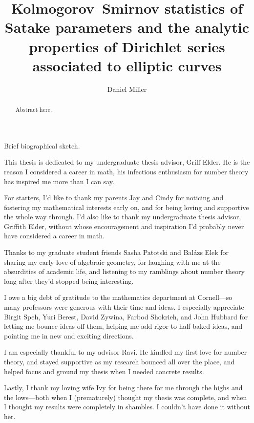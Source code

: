 \documentclass[phd,cornellheadings,draft]{cornell}
\title{Kolmogorov--Smirnov statistics of Satake parameters and the analytic 
properties of Dirichlet series associated to elliptic curves}
\author{Daniel Miller}
\begin{document}
\maketitle
\makecopyright

\begin{abstract}
Abstract here. 
\end{abstract}

\begin{biosketch}
Brief biographical sketch.
\end{biosketch}

\begin{dedication}
This thesis is dedicated to my undergraduate thesis advisor, Griff Elder. 
He is the reason I considered a career in math, his infectious enthusiasm for 
number theory has inspired me more than I can say. 
\end{dedication}

\begin{acknowledgements}
For starters, I'd like to thank my parents Jay and Cindy for noticing and 
fostering my mathematical interests early on, and for being loving and 
supportive the whole way through. I'd also like to thank my undergraduate 
thesis advisor, Griffith Elder, without whose encouragement and inspiration 
I'd probably never have considered a career in math. 

Thanks to my graduate student friends Sasha Patotski and Bal\'azs Elek for 
sharing my early love of algebraic geometry, for laughing with me at the 
absurdities of academic life, and listening to my ramblings about number 
theory long after they'd stopped being interesting. 

I owe a big debt of gratitude to the mathematics department at Cornell---so 
many professors were generous with their time and ideas. I especially 
appreciate Birgit Speh, Yuri Berest, David Zywina, Farbod Shokrieh, and John 
Hubbard for letting me bounce ideas off them, helping me add rigor to 
half-baked ideas, and pointing me in new and exciting directions. 

I am especially thankful to my advisor Ravi. He kindled my first love for 
number theory, and stayed supportive as my research bounced all over the place, 
and helped focus and ground my thesis when I needed concrete results. 

Lastly, I thank my loving wife Ivy for being there for me through the highs and 
the lows---both when I (prematurely) thought my thesis was complete, and when I 
thought my results were completely in shambles. I couldn't have done it 
without her. 
\end{acknowledgements}
\end{document}
